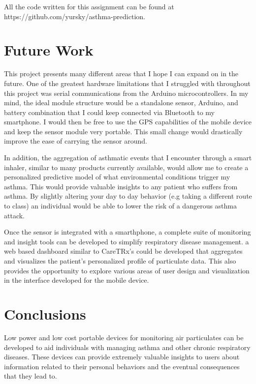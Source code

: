 \documentclass{sigchi}
\begin{document}
All the code written for this assignment can be found at https://github.com/yursky/asthma-prediction.


\section{Future Work}

This project presents many different areas that I hope I can expand on in the future.
One of the greatest hardware limitations that I struggled with throughout this project
was serial communications from the Arduino microcontrollers. In my mind, the ideal
module structure would be a standalone sensor, Arduino, and battery combination that
I could keep connected via Bluetooth to my smartphone. I would then be free to use the
GPS capabilities of the mobile device and keep the sensor module very portable. This small
change would drastically improve the ease of carrying the sensor around.

In addition, the aggregation of asthmatic events that I encounter through a smart
inhaler, similar to many products currently available, would allow me to create a
personalized predictive model of what environmental conditions trigger my asthma.
This would provide valuable insights to any patient who suffers from asthma.
By slightly altering your day to day behavior (e.g taking a different route to class)
an individual would be able to lower the risk of a dangerous asthma attack.

Once the sensor is integrated with a smarthphone, a complete suite of monitoring
and insight tools can be developed to simplify respiratory disease management. a
web based dashboard similar to CareTRx's could be developed that aggregates and
visualizes the patient's personalized profile of particulate data. \cite{caretrx}
This also provides the opportunity to explore various areas of user design and
visualization in the interface developed for the mobile device. 

\section{Conclusions}

Low power and low cost portable devices for monitoring air particulates can be developed
to aid individuals with managing asthma and other chronic respiratory diseases.
These devices can provide extremely valuable insights to users about information
related to their personal behaviors and the eventual consequences that they lead to.
\end{document}
